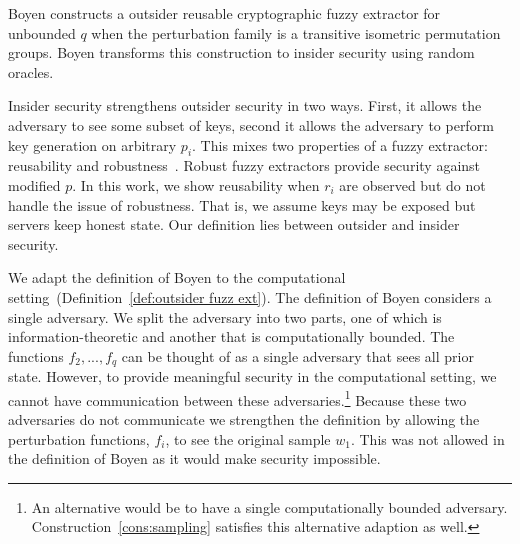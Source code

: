 \documentclass[11pt]{article}
\newcommand{\defref}[1]{\mbox{Definition~\ref{#1}}}
\newcommand{\consref}[1]{\mbox{Construction~\ref{#1}}}
\newcommand{\authnote}[2]{{\textcolor{red}{\textsf{#1 notes: }\textcolor{blue}{ #2}}\marginpar{\textcolor{red}{\textbf{!!!!!}}}}}
\newcommand{\authnote}[2]{}
\newcommand{\lnote}[1]{{\authnote{Leo}{#1}}}
\begin{document}
Boyen constructs a outsider reusable cryptographic fuzzy extractor for unbounded $q$ when the perturbation family is a transitive isometric permutation groups. Boyen transforms this construction to insider security using random oracles. %

Insider security strengthens outsider security in two ways.  First, it allows the adversary to see some subset of keys, second it allows the adversary to perform key generation on arbitrary $p_i$.  This mixes two properties of a fuzzy extractor:  reusability and robustness~\cite{dkrs2006}.  Robust fuzzy extractors provide security against modified $p$.  
In this work, we show reusability when $r_i$ are observed but do not handle the issue of robustness.  That is, we assume keys may be exposed but servers keep honest state.  Our definition lies between outsider and insider security.

We adapt the definition of Boyen to the computational setting~(\defref{def:outsider fuzz ext}).  
The definition of Boyen considers a single adversary.  We split the adversary into two parts, one of which is information-theoretic and another that is computationally bounded.  The functions $f_2,..., f_q$ can be thought of as a single adversary that sees all prior state.  However, to provide meaningful security in the computational setting, we cannot have communication between these adversaries.\footnote{An alternative would be to have a single computationally bounded adversary.  \consref{cons:sampling} satisfies this alternative adaption as well.}
Because these two adversaries do not communicate we strengthen the definition by allowing the perturbation functions,  $f_i$, to see the original sample $w_1$.  This was not allowed in the definition of Boyen as it would make security impossible.

\end{document}
